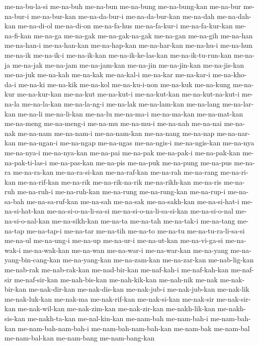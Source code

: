 {me-na-bu-la-si me-na-buh me-na-bun me-na-bung me-na-bung-kan me-na-bur
me-na-bur-i me-na-bur-kan me-na-da-bur-i me-na-da-bur-kan me-na-dah
me-na-dah-kan me-na-di-ol me-na-di-on me-na-fa-hus me-na-fa-kur-i
me-na-fa-kur-kan me-na-fi-kan me-na-ga me-na-gak me-na-gak-na-gak
me-na-gan me-na-gih me-na-han me-na-han-i me-na-han-kan me-na-hap-kan
me-na-har-kan me-na-hu-i me-na-hun me-na-ik me-na-ik-i me-na-ik-kan
me-na-ik-ke-las-kan me-na-ik-tu-run-kan me-na-ja me-na-jak me-na-jam
me-na-jam-kan me-na-jin me-na-jin-kan me-na-jis-kan me-na-juk me-na-kah
me-na-kak me-na-kal-i me-na-kar me-na-kar-i me-na-kho-da-i me-na-ki
me-na-kik me-na-kol me-na-ku-i-non me-na-kuk me-na-kung me-na-kur
me-na-kur-kan me-na-kut me-na-kut-i me-na-kut-kan me-na-kut-na-kut-i
me-na-la me-na-la-kan me-na-la-ng-i me-na-lak me-na-lam-kan me-na-lang
me-na-lar-kan me-na-li me-na-li-kan me-na-lu me-na-ma-i me-na-ma-kan
me-na-mat-kan me-na-meng me-na-meng-i me-na-mu me-na-mu-i me-na-nah
me-na-nai me-na-nak me-na-nam me-na-nam-i me-na-nam-kan me-na-nang
me-na-nap me-na-nar-kan me-na-ngan-i me-na-ngap me-na-ngas me-na-ngis-i
me-na-ngis-kan me-na-nya me-na-nya-i me-na-nya-kan me-na-pai me-na-pak
me-na-pak-i me-na-pak-kan me-na-pak-ti-las-i me-na-pas-kan me-na-pis
me-na-puk me-na-pung me-na-pus me-na-ra me-na-ra-kan me-na-ra-si-kan
me-na-raf-kan me-na-rah me-na-rang me-na-ri-kan me-na-rif-kan me-na-rik
me-na-rik-na-rik me-na-rikh-kan me-na-ris me-na-ruh me-na-ruh-i
me-na-ruh-kan me-na-rung me-na-rung-kan me-na-rup-i me-na-sa-bah
me-na-sa-ruf-kan me-na-sah me-na-sak me-na-sakh-kan me-na-si-hat-i
me-na-si-hat-kan me-na-si-o-na-li-sa-si me-na-si-o-na-li-sa-si-kan
me-na-si-o-nal me-na-si-o-nal-kan me-na-sikh-kan me-na-ta me-na-tah
me-na-tak-i me-na-tang me-na-tap me-na-tap-i me-na-tar me-na-tih me-na-to
me-na-tu me-na-tu-ra-li-sa-si me-na-ul me-na-ung-i me-na-up me-na-ur-i
me-na-ut-kan me-na-vi-ga-si me-na-wak-i me-na-wak-kan me-na-wan
me-na-war-i me-na-war-kan me-na-yang me-na-yang-bin-cang-kan
me-na-yang-kan me-na-zam-kan me-na-zar-kan me-nab-lig-kan me-nab-rak
me-nab-rak-kan me-nad-bir-kan me-naf-kah-i me-naf-kah-kan me-naf-sir
me-naf-sir-kan me-nah-bis-kan me-nah-kik-kan me-nah-nik me-nak
me-nak-bir-kan me-nak-dir-kan me-nak-dis-kan me-nak-jub-i me-nak-jub-kan
me-nak-lik me-nak-luk-kan me-nak-ma me-nak-rif-kan me-nak-si-kan
me-nak-sir me-nak-sir-kan me-nak-wil-kan me-nak-zim-kan me-nak-zir-kan
me-nakh-lik-kan me-nakh-sis-kan me-nakh-ta-kan me-nal-kin-kan me-nam-bah
me-nam-bah-i me-nam-bah-kan me-nam-bah-nam-bah-i me-nam-bah-nam-bah-kan
me-nam-bak me-nam-bal me-nam-bal-kan me-nam-bang me-nam-bang-kan
}

